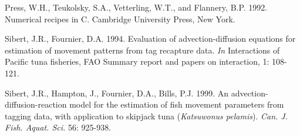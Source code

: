 
\begin{thebibliography}{}



 Press, W.H., Teukolsky, S.A., Vetterling, W.T., and Flannery, B.P. 1992. Numerical recipes in C. Cambridge University Press, New York.

 Sibert, J.R., Fournier, D.A. 1994. Evaluation of advection-diffusion equations for estimation of movement patterns from tag recapture data. \textit{In} Interactions of Pacific tuna fisheries, FAO Summary report and papers on interaction, 1: 108-121.

 Sibert, J.R., Hampton, J., Fournier, D.A., Bills, P.J. 1999. An advection-diffusion-reaction model for the estimation of fish movement parameters from tagging data, with application to skipjack tuna ({\it Katsuwonus pelamis}). \textit {Can. J. Fish. Aquat. Sci.} 56: 925-938. 

\end{thebibliography}
